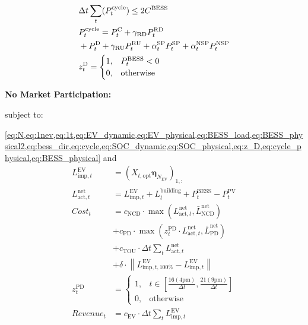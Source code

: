 \documentclass[conference]{IEEEtran}
\begin{document}
\begin{align}
    &\Delta{t} \sum_t (P^{\text{cycle}}_t) \leq 2 C^{\text{BESS}} \label{eq:cycle_physical} \\
    &P^{\text{cycle}}_t = P^{\text{C}}_{t} + \gamma_{{\text{RD}}} P^{{\text{RD}}}_t \notag \\
    &+ P^{\text{D}}_{t} + \gamma_{{\text{RU}}} P^{{\text{RU}}}_t + \alpha^{{\text{SP}}}_t P^{{\text{SP}}}_t + \alpha^{{\text{NSP}}}_t P^{{\text{NSP}}}_t \label{eq:cycle} \\
    &z^{\text{D}}_t =
    \begin{cases} 
        1, & P^{\text{BESS}}_t < 0 \\
        0, & \text{otherwise}
    \end{cases} \label{eq:z_D} 
\end{align}




\textbf{No Market Participation:}

subject to:

\cref{eq:N,eq:1nev,eq:1t,eq:EV_dynamic,eq:EV_physical,eq:BESS_load,eq:BESS_physical2,eq:bess_dir,eq:cycle,eq:SOC_dynamic,eq:SOC_physical,eq:z_D,eq:cycle_physical,eq:BESS_physical} and
\begin{align}
    L_{\text{imp},t}^{\text{EV}} &= (X_{t,\text{opt}} \pmb{\eta}_{N_{\text{EV}}} \label{eq:load_ev_imp_eta})_{1,:} \\
    L^{\text{net}}_{\text{act},t} &= L_{\text{imp},t}^{\text{EV}} + L_{t}^{\text{building}} + P^{\text{BESS}}_t - P^{\text{PV}}_t \label{eq:actual_net_load} \\
    Cost_t &= c_{\text{NCD}} \cdot \max \left(L^{\text{net}}_{\text{act},t}, \bar{L}^{\text{net}}_{\text{NCD}} \right) \label{eq:ncd} \\
    &+ c_{\text{PD}} \cdot \max \left(z^{\text{PD}}_t \cdot L^{\text{net}}_{\text{act},t}, \bar{L}^{\text{net}}_{\text{PD}} \right) \label{eq:pd} \\
    &+ c_{\text{TOU}} \cdot \Delta t \sum_t L^{\text{net}}_{\text{act},t} \label{eq:tou} \\
    &+ \delta \cdot \left\| L_{\text{imp},t,100\%}^{\text{EV}} - L_{\text{imp},t}^{\text{EV}} \right\| \label{eq:SLR_penalty} \\
    z_t^{\text{PD}} &=
    \begin{cases} 
        1, & t \in \left [ \frac{16 (4\text{pm})}{\Delta t},  \frac{21 (9\text{pm})}{\Delta t} \right  ]  \\
        0, & \text{otherwise}  
    \end{cases} \label{eq:z_pd} \\
    Revenue_t &= c_{\text{EV}} \cdot \Delta t \sum_t L^{\text{EV}}_{\text{imp},t} \label{eq:c_ev}
\end{align}
\end{document}
